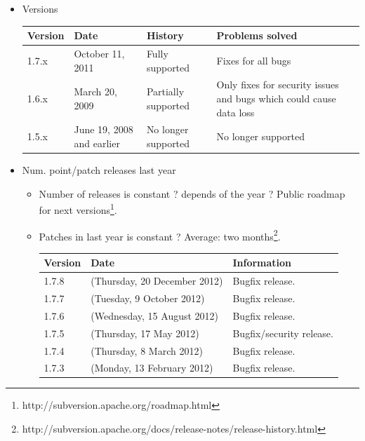\documentclass[11pt]{scrartcl}
\begin{document}
\begin{itemize}
    \item Versions

        \begin{table}[H]
        \centering
        \begin{tabular}{p{1cm} p{3cm} p{4cm} p{4cm}}
            \hline
                {\bf Version} & {\bf Date} & {\bf History} & {\bf Problems solved}\\
            \hline
                1.7.x & October 11, 2011 & Fully supported & Fixes for all bugs\\
            \hline
                1.6.x & March 20, 2009 & Partially supported & Only fixes for security issues and bugs which could cause data loss\\
            \hline
                1.5.x & June 19, 2008 and earlier & No longer supported & No longer supported\\
            \hline
        \end{tabular}
        \end{table}
    \item Num. point/patch releases last year
    \begin{itemize}
        \item Number of releases is constant ? depends of the year ? Public roadmap for next versions\footnote{http://subversion.apache.org/roadmap.html}.
        \item Patches in last year is constant ? Average: two months\footnote{http://subversion.apache.org/docs/release-notes/release-history.html}.

            \begin{table}[H]
            \centering
            \begin{tabular}{p{1cm} p{5cm} p{4cm}}
                \hline Version & Date & Information\\
                \hline 1.7.8 & (Thursday, 20 December 2012) & Bugfix release.\\
                \hline 1.7.7 & (Tuesday, 9 October 2012) & Bugfix release.\\
                \hline 1.7.6 & (Wednesday, 15 August 2012) & Bugfix release.\\
                \hline 1.7.5 & (Thursday, 17 May 2012) & Bugfix/security release.\\
                \hline 1.7.4 & (Thursday, 8 March 2012) & Bugfix release.\\
                \hline 1.7.3 & (Monday, 13 February 2012) & Bugfix release.\\
                \hline
            \end{tabular}
            \end{table}
    \end{itemize}
\end{itemize}
\end{document}
